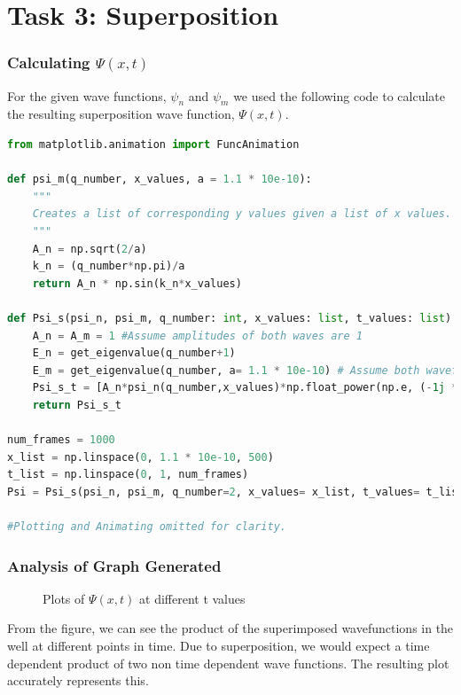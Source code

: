 \documentclass[a4paper,12pt]{article}
\begin{document}
\section{Task 3: Superposition}
\subsubsection{Calculating \(\Psi(x,t)\)}
For the given wave functions, \(\psi_n\) and \(\psi_m\) we used the following code to calculate the resulting superposition wave function, \(\Psi(x,t)\).

\begin{lstlisting}[language=Python, caption= Code used to plot findings]
from matplotlib.animation import FuncAnimation

def psi_m(q_number, x_values, a = 1.1 * 10e-10):
    """
    Creates a list of corresponding y values given a list of x values.
    """
    A_n = np.sqrt(2/a)
    k_n = (q_number*np.pi)/a
    return A_n * np.sin(k_n*x_values)

def Psi_s(psi_n, psi_m, q_number: int, x_values: list, t_values: list):
    A_n = A_m = 1 #Assume amplitudes of both waves are 1
    E_n = get_eigenvalue(q_number+1)
    E_m = get_eigenvalue(q_number, a= 1.1 * 10e-10) # Assume both wavefunctions have the same quantum number
    Psi_s_t = [A_n*psi_n(q_number,x_values)*np.float_power(np.e, (-1j * E_n * t / constants.hbar )) + A_m*psi_m(q_number,x_values)*np.float_power(np.e, (-1j * E_m * t / constants.hbar )) for t in t_values]
    return Psi_s_t

num_frames = 1000
x_list = np.linspace(0, 1.1 * 10e-10, 500)
t_list = np.linspace(0, 1, num_frames)
Psi = Psi_s(psi_n, psi_m, q_number=2, x_values= x_list, t_values= t_list)

#Plotting and Animating omitted for clarity.
\end{lstlisting}

\subsubsection{Analysis of Graph Generated}
\begin{figure}[H]

\caption{Plots of \(\Psi(x,t)\) at different t values}
\end{figure}
From the figure, we can see the product of the superimposed wavefunctions in the well at different points in time. Due to superposition, we would expect a time dependent product of two non time dependent wave functions. The resulting plot accurately represents this. 
\clearpage
\end{document}
